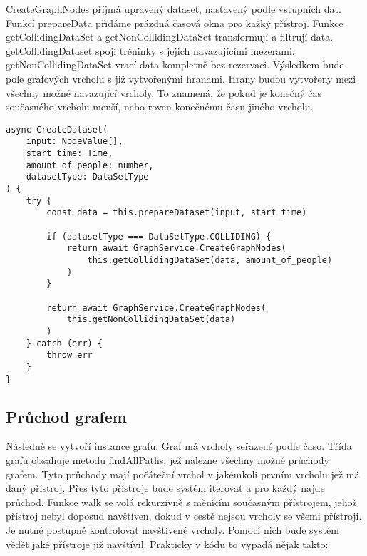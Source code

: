 CreateGraphNodes příjmá upravený dataset, nastavený podle vstupních dat. Funkcí prepareData přidáme prázdná časová okna pro kažký přístroj. Funkce getCollidingDataSet a getNonCollidingDataSet transformují a filtrují data. getCollidingDataset spojí tréninky s jejich navazujícími mezerami. getNonCollidingDataSet vrací data kompletně bez rezervaci. Výsledkem bude pole grafových vrcholu s již vytvořenými hranami. Hrany budou vytvořeny mezi všechny možné navazující vrcholy. To znamená, že pokud je konečný čas současného vrcholu menší, nebo roven konečnému času jiného vrcholu.

\begin{lstlisting}
async CreateDataset(
    input: NodeValue[],
    start_time: Time,
    amount_of_people: number,
    datasetType: DataSetType
) {
    try {
	    const data = this.prepareDataset(input, start_time)

	    if (datasetType === DataSetType.COLLIDING) {
		    return await GraphService.CreateGraphNodes(
			    this.getCollidingDataSet(data, amount_of_people)
		    )
	    }

	    return await GraphService.CreateGraphNodes(
		    this.getNonCollidingDataSet(data)
	    )
    } catch (err) {
	    throw err
    }
}
\end{lstlisting}

\subsection{Průchod grafem}

Následně se vytvoří instance grafu. Graf má vrcholy seřazené podle časo. Třída grafu obsahuje metodu findAllPaths, jež nalezne všechny možné průchody grafem. Tyto průchody mají počáteční vrchol v jakémkoli prvním vrcholu jež má daný přístroj. Přes tyto přístroje bude systém iterovat a pro každý najde průchod. Funkce walk se volá rekurzivně s měnícím současným přístrojem, jehož přístroj nebyl doposud navštíven, dokud v cestě nejsou vrcholy se všemi přístroji. Je nutné postupně kontrolovat navštívené vrcholy. Pomocí nich bude systém vědět jaké přístroje již navštívil. Prakticky v kódu to vypadá nějak takto:

